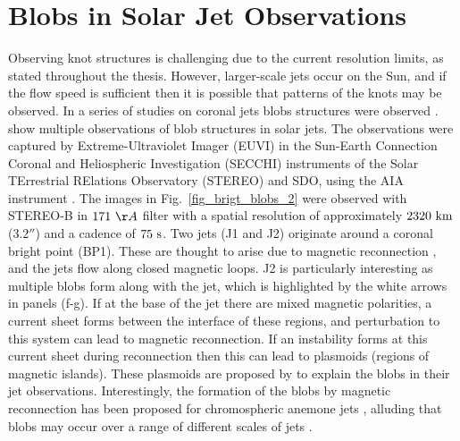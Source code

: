 \section{Blobs in Solar Jet Observations}
\label{sec:EUV_jets}
Observing knot structures is challenging due to the current resolution limits, as stated throughout the thesis. However, larger-scale jets occur on the Sun, and if the flow speed is sufficient then it is possible that patterns of the knots may be observed. In a series of studies on coronal jets blobs structures were observed \citep{Zhang2014AA567A11Z, Zhang2016SoPh291859Z, Chen2015ApJ81571C, Chen2017ApJ84054C}.  \np
%
\cite{Zhang2016SoPh291859Z} show multiple observations of blob structures in solar jets. The observations were captured by Extreme-Ultraviolet Imager (EUVI) in the Sun-Earth Connection Coronal and Heliospheric Investigation (SECCHI) \citep{Howard2008SSRv13667H} instruments of the Solar TErrestrial RElations Observatory (STEREO) \citep{Kaiser2005AdSpR361483K} and SDO, using the AIA instrument \citep{Lemen2012SoPh27517L}. The images in Fig.~\ref{fig_brigt_blobs_2} were observed with STEREO-B in $171~\AA$ filter with a spatial resolution of approximately $2320~\rm{km}$ ($\ang{;;3.2}$) and a cadence of $75~\rm{s}$. Two jets (J1 and J2) originate around a coronal bright point (BP1). These are thought to arise due to magnetic reconnection \citep{Priest1994ApJ427459P, Mandrini1996SoPh168115M, Longcope1998ApJ507433L, Santos2007ASTRA329S}, and the jets flow along closed magnetic loops. J2 is particularly interesting as multiple blobs form along with the jet, which is highlighted by the white arrows in panels (f-g). If at the base of the jet there are mixed magnetic polarities, a current sheet forms between the interface of these regions, and perturbation to this system can lead to magnetic reconnection. If an instability forms at this current sheet during reconnection then this can lead to plasmoids (regions of magnetic islands)\citep{Drake2006Natur443553D}. These plasmoids are proposed by \cite{Zhang2016SoPh291859Z} to explain the blobs in their jet observations. Interestingly, the formation of the blobs by magnetic reconnection has been proposed for chromospheric anemone jets \citep{Singh2012ApJ75933S}, alluding that blobs may occur over a range of different scales of jets \citep{Zhang2016SoPh291859Z}.\np 
